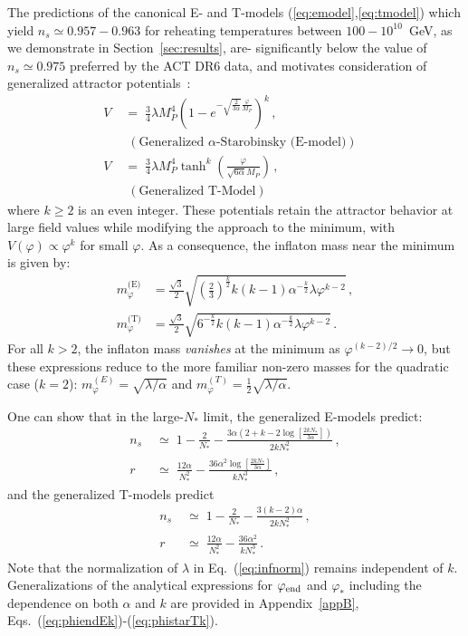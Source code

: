 \documentclass[aps,prev,twocolumn,preprintnumbers,floatfix,nofootinbib]{revtex4-1}
\begin{document}
 The predictions of the canonical E- and T-models (\ref{eq:emodel},\ref{eq:tmodel}) which yield $n_s \simeq 0.957 - 0.963$ for reheating temperatures between $100-10^{10}$~GeV, as we demonstrate in Section~\ref{sec:results}, are- significantly below the value of $n_s \simeq 0.975$ preferred by the ACT DR6 data, and motivates consideration of generalized attractor potentials~\cite{Carrasco:2015rva, ENOV3, ENOV4}:
\begin{align}
\label{eq:alphastarogeneral}
V & \; = \; \frac{3}{4} \lambda  M_{P}^{4}\left(1-e^{-\sqrt{\frac{2}{3 \alpha}} \frac{\varphi}{M_{P}}}\right)^{k} \, , & \nonumber \\
& \; \; (\text{Generalized $\alpha$-Starobinsky (E-model)})&  \\
\label{eq:tmodelgeneral}
V & \; = \; \frac{3}{4}  \lambda M_P^4 \tanh^{k} \left(\frac{\varphi}{\sqrt{6 \alpha}M_P } \right) \,, & \nonumber \\
& \; \; (\text{Generalized T-Model}) &
\end{align}
where $k \geq 2$ is an even integer. These potentials retain the attractor behavior at large field values while modifying the approach to the minimum, with $V(\varphi) \propto \varphi^k$ for small $\varphi$. As a consequence, the inflaton mass near the minimum is given by:
\begin{align}
\label{eq:infmass1gen}
m_{\varphi}^{\text{(E)}} &= \frac{\sqrt{3}}{2} \sqrt{\left(\frac{2}{3}\right)^{\frac{k}{2}}k(k-1) \alpha^{-\frac{k}{2}} \lambda \varphi^{k-2}} \, ,
\\
\label{eq:infmass2gen}
m_{\varphi}^{\text{(T)}} &= \frac{\sqrt{3}}{2} \sqrt{6^{-\frac{k}{2}}k(k-1) \alpha^{-\frac{k}{2}} \lambda \varphi^{k-2}} \,.
\end{align}
For all $k>2$, the inflaton mass \emph{vanishes} at the minimum as $\varphi^{(k-2)/2} \to 0$, but these expressions reduce to the more familiar non-zero masses for the quadratic case ($k=2$): $m_\varphi^{(E)}=\sqrt{\lambda/\alpha}$ and $m_\varphi^{(T)}=\frac{1}{2}\sqrt{\lambda/\alpha}$. 

One can show that in the large-$N_*$ limit, the generalized E-models predict: 
\begin{align}
\label{eq:genemodns}
n_s& \; \simeq \; 1 - \frac{2}{N_*} - \frac{3 \alpha(2 + k - 2\log[\frac{2kN_*}{3 \alpha}])}{2k N_*^2} \, ,   \\
\label{eq:genemodr}
r & \; \simeq \; \frac{12 \alpha}{N_*^2} - \frac{36 \alpha^2 \log[\frac{2kN_*}{3 \alpha}]}{k N_*^3} \, ,
\end{align}
and the generalized T-models predict
\begin{align}
\label{eq:gentmodns}
n_s& \; \simeq \; 1 - \frac{2}{N_*} - \frac{3(k - 2) \alpha}{2kN_*^2} \, ,   \\
\label{eq:gentmodr}
r & \; \simeq \; \frac{12 \alpha}{N_*^2} - \frac{36 \alpha^2}{k N_*^3} \, .
\end{align}
Note that the normalization of $\lambda$ in Eq.~(\ref{eq:infnorm}) remains independent of $k$. Generalizations of the analytical expressions for $\varphi_{\rm end}$ and $\varphi_*$ including the dependence on both $\alpha$ and $k$ are provided in Appendix~\ref{appB}, Eqs.~(\ref{eq:phiendEk})-(\ref{eq:phistarTk}).
\end{document}
